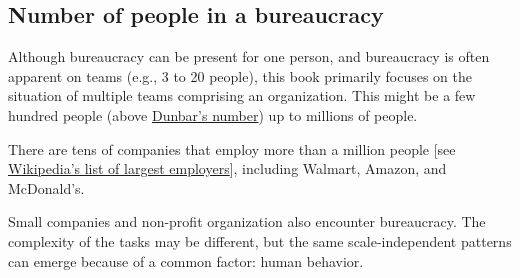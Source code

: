 \subsection{Number of people in a bureaucracy}
Although bureaucracy can be present for one person, and bureaucracy is often apparent on teams (e.g., 3 to 20 people), this book primarily focuses on the situation of multiple teams comprising an organization. This might be a few hundred people (above \href{https://en.wikipedia.org/wiki/Dunbar's_number}{Dunbar's number}) up to millions of people. 

There are tens of companies that employ more than a million people [see \href{https://en.wikipedia.org/wiki/List_of_largest_employers}{Wikipedia's list of largest employers}], including Walmart, Amazon, and McDonald's.

Small companies and non-profit organization also encounter bureaucracy. The complexity of the tasks may be different, but the same scale-independent patterns can emerge because of a common factor: human behavior.